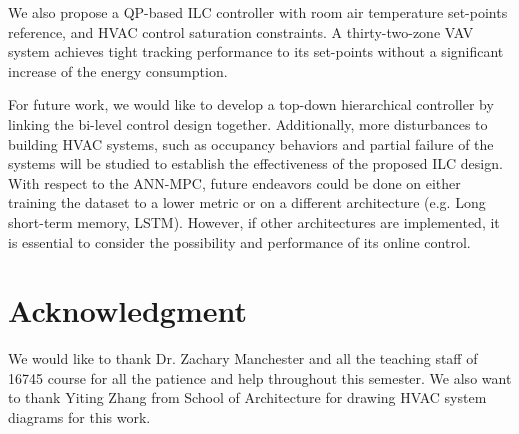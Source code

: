 \documentclass[conference]{IEEEtran}
\begin{document}
We also propose a QP-based ILC controller with room air temperature set-points reference, and HVAC control saturation constraints. A thirty-two-zone VAV system achieves tight tracking performance to its set-points without a significant increase of the energy consumption. 

For future work, we would like to develop a top-down hierarchical controller by linking the bi-level control design together. Additionally, more disturbances to building HVAC systems, such as occupancy behaviors and partial failure of the systems will be studied to establish the effectiveness of the proposed ILC design. With respect to the ANN-MPC, future endeavors could be done on either training the dataset to a lower metric or on a different architecture (e.g. Long short-term memory, LSTM). However, if other architectures are implemented, it is essential to consider the possibility and performance of its online control.
\section*{Acknowledgment}

We would like to thank Dr. Zachary Manchester and all the teaching staff of 16745 course for all the patience and help throughout this semester. We also want to thank Yiting Zhang from School of Architecture for drawing HVAC system diagrams for this work.




\end{document}

